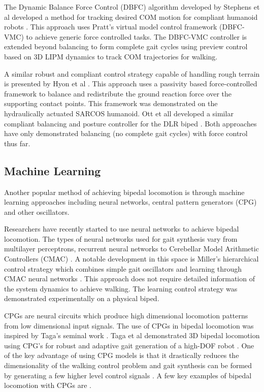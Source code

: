 The Dynamic Balance Force Control (DBFC) algorithm developed by Stephens et al developed a method for tracking desired COM motion for compliant humanoid robots \cite{Stephens:2010fj}. This approach uses Pratt's virtual model control framework (DBFC-VMC) to achieve generic force controlled tasks. The DBFC-VMC controller is extended beyond balancing to form complete gait cycles using preview control \cite{KajitaEtAlICRA2003} based on 3D LIPM dynamics to track COM trajectories for walking. 

A similar robust and compliant control strategy capable of handling rough terrain is presented by Hyon et al \cite{Hyon2007}. This approach uses a passivity based force-controlled framework to balance and redistribute the ground reaction force over the supporting contact points. This framework was demonstrated on the hydraulically actuated SARCOS humanoid. Ott et all developed a similar compliant balancing and posture controller for the DLR biped \cite{Ott:2010jz}. Both approaches have only demonstrated balancing (no complete gait cycles) with force control thus far. 



\subsection{Machine Learning} %
\label{sub:related_machine_learning}
Another popular method of achieving bipedal locomotion is through machine learning approaches including neural networks, central pattern generators (CPG) and other oscillators. 

Researchers have recently started to use neural networks to achieve bipedal locomotion. The types of neural networks used for gait synthesis vary from multilayer perceptrons, recurrent neural networks to Cerebellar Model Arithmetic Controllers (CMAC) \cite{Katic2003}. A notable development in this space is Miller's hierarchical control strategy which combines simple gait oscillators and learning through CMAC neural networks \cite{Miller1994,Kun1996}. This approach does not require detailed information of the system dynamics to achieve walking. The learning control strategy was demonstrated experimentally on a physical biped.  

CPGs are neural circuits which produce high dimensional locomotion patterns from low dimensional input signals. The use of CPGs in bipedal locomotion was inspired by Taga's seminal work \cite{Taga1991,Taga1998}. Taga et al demonstrated 3D bipedal locomotion using CPG's for robust and adaptive gait generation of a high-DOF robot \cite{Miyakoshi1998}. One of the key advantage of using CPG models is that it drastically reduces the dimensionality of the walking control problem and gait synthesis can be formed by generating a few higher level control signals \cite{Ijspreet2008}. A few key examples of bipedal locomotion with CPGs are \cite{Morimoto2006,Righetti2006,Aoi2005}.


